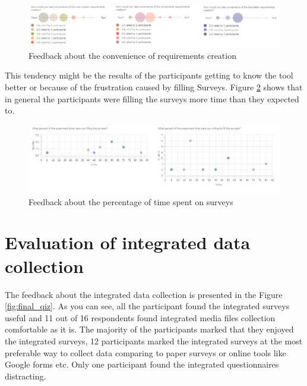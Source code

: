 \begin{figure}[htb]
 \centering
\includegraphics[width=\textwidth]{figures/convenience.jpg}
\caption{Feedback about the convenience of requirements creation}
\label{fig:convenience}
\end{figure}

This tendency might be the results of the participants getting to know the tool better or because of the frustration caused by filling Surveys. Figure \ref{fig:surveys_time} shows that in general the participants were filling the surveys more time than they expected to.\\

\begin{figure}[htb]
 \centering
\includegraphics[width=\textwidth]{figures/surveys_time.jpg}
\caption{Feedback about the percentage of time spent on surveys}
\label{fig:surveys_time}
\end{figure}




\section{Evaluation of integrated data collection} \label{section:evaluation}

The feedback about the integrated data collection is presented in the Figure \ref{fig:final_qiz}. As you can see, all the participant found the integrated surveys useful and 11 out of 16 respondents found integrated media files collection comfortable as it is. The majority of the participants marked that they enjoyed the integrated surveys, 12 participants marked the integrated surveys at the most preferable way to collect data comparing to paper surveys or online tools like Google forms etc. Only one participant found the integrated questionnaires distracting.\\


